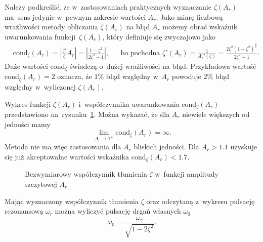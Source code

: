 \documentclass[paper=a4,DIV=12]{lpas}
\begin{document}
\begin{appendices}
  Należy podkreślić, że w~zastosowaniach praktycznych wyznaczanie $\zeta(A_r)$
  ma~sens jedynie w~pewnym zakresie wartości $A_r$.
  Jako miarę liczbową wrażliwości metody obliczania $\zeta(A_r)$ na błąd $A_r$
  możemy obrać wskaźnik uwarunkowania funkcji~$\zeta(A_r)$, który definiuje się
  zwyczajowo jako
  \begin{equation}
    \begin{aligned}
      &
      \text{cond}_{\zeta}(A_r)
        = \left|\frac{\zeta'}{\zeta} A_r\right|
        = \left|\frac{1-\zeta^2}{2\zeta^2-1}\right|,
      &&
      \text{bo pochodna }\zeta'(A_r)
        = \frac{1}{A_r'(\zeta)}
        = \frac{2 \zeta^2 (1-\zeta^2)^{\frac{3}{2}}}{2 \zeta^2 - 1}.
      &
    \end{aligned}
    \label{eq:HY93S}
  \end{equation}
  Duże wartości $\text{cond}_{\zeta}$ świadczą o~dużej wrażliwości na błąd.
  Przykładowa wartość $\text{cond}_{\zeta}(A_r) = 2$ oznacza, że $1\%$ błąd
  względny w~$A_r$ powoduje $2\%$ błąd względny w~wyliczonej $\zeta(A_r)$.

  Wykres funkcji $\zeta(A_r)$ i~współczynnika uwarunkowania
  $\text{cond}_{\zeta}(A_r)$ przedstawiono na~rysunku~\ref{fig:5O32M}. Można
  wykazać, że dla $A_r$ niewiele większych od jedności mamy
  \begin{equation}
    \lim_{A_r \to 1^{+}} \text{cond}_{\zeta}(A_r) = \infty.
    \label{eq:77ILN}
  \end{equation}
  Metoda nie ma więc zastosowania dla $A_r$ bliskich jedności. Dla $A_r > 1.1$
  uzyskuje się już akceptowalne wartości wskaźnika $\text{cond}_{\zeta}(A_r) < 1.7$.
  \begin{figure}[H]
    \centering
    
    \caption{Bezwymiarowy współczynnik tłumienia $\zeta$ w~funkcji amplitudy
             szczytowej $A_r$}
    \label{fig:5O32M}
  \end{figure}

  Mając wyznaczony współczynnik tłumienia $\zeta$ oraz odczytaną z~wykresu
  pulsację rezonansową $\omega_r$ moż\-na wyliczyć pulsację drgań własnych
  $\omega_0$
  \begin{equation}
    \omega_0 = \frac{\omega_r}{\sqrt{1 - 2\zeta^2}}.
    \label{eq:GIWGJ}
  \end{equation}


\end{appendices}
\end{document}
